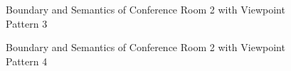 \documentclass[11pt, a4paper,oneside,chapterprefix=false]{scrbook}
\begin{document}
\begin{figure}[H]
    \centering
      \label{fig:conf2 b 2} \hfill
     \label{fig:conf2 s 2}
    \caption{Boundary and Semantics of Conference Room 2 with Viewpoint Pattern 3}
    \label{fig:conf2 2}
\end{figure}

\begin{figure}[H]
    \centering
      \label{fig:conf2 b 4} \hfill
     \label{fig:conf2 s 4}
    \caption{Boundary and Semantics of Conference Room 2 with Viewpoint Pattern 4}
    \label{fig:conf2 4}
\end{figure}
\end{document}
